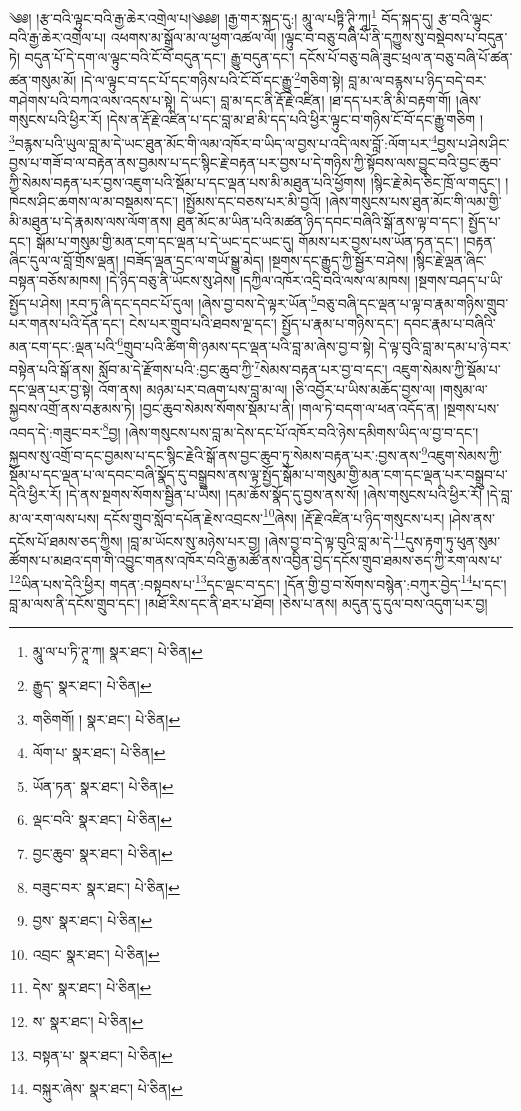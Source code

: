 \setcounter{footnote}{0} 
༄༅། །རྩ་བའི་ལྟུང་བའི་རྒྱ་ཆེར་འགྲེལ་པ།༄༅༅། །རྒྱ་གར་སྐད་དུ:། མཱུ་ལ་པཏྟི་ཊཱི་ཀཱ།\footnote{མཱུ་ལ་པ་ཏི་ཊཱ་ཀ།  སྣར་ཐང་།  པེ་ཅིན། } བོད་སྐད་དུ། རྩ་བའི་ལྟུང་བའི་རྒྱ་ཆེར་འགྲེལ་པ། འཕགས་མ་སྒྲོལ་མ་ལ་ཕྱག་འཚལ་ལོ། །ལྟུང་བ་བཅུ་བཞི་པོ་ནི་དཀྱུས་སུ་བསྡེབས་པ་བདུན་ཏེ། བདུན་པོ་དེ་དག་ལ་ལྟུང་བའི་ངོ་བོ་བདུན་དང་། རྒྱུ་བདུན་དང་། དངོས་པོ་བཅུ་བཞི་ཟུང་ཕྲལ་ན་བཅུ་བཞི་པོ་ཚན་ཚན་གསུམ་མོ། །དེ་ལ་ལྟུང་བ་དང་པོ་དང་གཉིས་པའི་ངོ་བོ་དང་རྒྱུ་\footnote{རྒྱུད་  སྣར་ཐང་།  པེ་ཅིན། }གཅིག་སྟེ། བླ་མ་ལ་བརྙས་པ་ཉིད་བདེ་བར་གཤེགས་པའི་བཀའ་ལས་འདས་པ་སྟེ། དེ་ཡང་། བླ་མ་དང་ནི་རྡོ་རྗེ་འཛིན། །ཐ་དད་པར་ནི་མི་བརྟག་གོ། །ཞེས་གསུངས་པའི་ཕྱིར་རོ། །དེས་ན་རྡོ་རྗེ་འཛིན་པ་དང་བླ་མ་ཐ་མི་དད་པའི་ཕྱིར་ལྟུང་བ་གཉིས་ངོ་བོ་དང་རྒྱུ་གཅིག །\footnote{གཅིགགོ། །  སྣར་ཐང་།  པེ་ཅིན། }བརྙས་པའི་ཡུལ་བླ་མ་དེ་ཡང་ཐུན་མོང་གི་ལམ་འཁོར་བ་ཡིད་ལ་བྱས་པ་འདི་ལས་བློ་:ལོག་པར་\footnote{ལོག་པ་  སྣར་ཐང་།  པེ་ཅིན། }བྱས་པ་ཤེས་ཤིང་བྱས་པ་གཟོ་བ་ལ་བརྟེན་ནས་བྱམས་པ་དང་སྙིང་རྗེ་བརྟན་པར་བྱས་པ་དེ་གཉིས་ཀྱི་སྟོབས་ལས་བྱུང་བའི་བྱང་ཆུབ་ཀྱི་སེམས་བརྟན་པར་བྱས་འཇུག་པའི་སྡོམ་པ་དང་ལྡན་པས་མི་མཐུན་པའི་ཕྱོགས། །སྙིང་རྗེ་མེད་ཅིང་ཁྲོ་ལ་གདུང་། །ཁེངས་ཤིང་ཆགས་ལ་མ་བསྡམས་དང་། །སྤྱོམས་དང་བཅས་པར་མི་བྱའོ། །ཞེས་གསུངས་པས་ཐུན་མོང་གི་ལམ་གྱི་མི་མཐུན་པ་དེ་རྣམས་ལས་ལོག་ནས། ཐུན་མོང་མ་ཡིན་པའི་མཚན་ཉིད་དབང་བཞིའི་སྒོ་ནས་ལྟ་བ་དང་། སྤྱོད་པ་དང་། སྒོམ་པ་གསུམ་གྱི་མན་ངག་དང་ལྡན་པ་དེ་ཡང་དང་ཡང་དུ། གོམས་པར་བྱས་པས་ཡོན་ཏན་དང་། །བརྟན་ཞིང་དུལ་ལ་བློ་གྲོས་ལྡན། །བཟོད་ལྡན་དྲང་ལ་གཡོ་སྒྱུ་མེད། །སྔགས་དང་རྒྱུད་ཀྱི་སྦྱོར་བ་ཤེས། །སྙིང་རྗེ་ལྡན་ཞིང་བསྟན་བཅོས་མཁས། །དེ་ཉིད་བཅུ་ནི་ཡོངས་སུ་ཤེས། །དཀྱིལ་འཁོར་འདྲི་བའི་ལས་ལ་མཁས། །སྔགས་བཤད་པ་ཡི་སྤྱོད་པ་ཤེས། །རབ་ཏུ་ཞི་དང་དབང་པོ་དུལ། །ཞེས་བྱ་བས་དེ་ལྟར་ཡོན་\footnote{ཡོན་ཏན་  སྣར་ཐང་།  པེ་ཅིན། }བཅུ་བཞི་དང་ལྡན་པ་ལྟ་བ་རྣམ་གཉིས་གྲུབ་པར་གནས་པའི་དོན་དང་། ངེས་པར་གྲུབ་པའི་ཐབས་ལྔ་དང་། སྤྱོད་པ་རྣམ་པ་གཉིས་དང་། དབང་རྣམ་པ་བཞིའི་མན་ངག་དང་:ལྡན་པའི་\footnote{ལྡང་བའི་  སྣར་ཐང་།  པེ་ཅིན། }གྲུབ་པའི་ཚིག་གི་ཉམས་དང་ལྡན་པའི་བླ་མ་ཞེས་བྱ་བ་སྟེ། དེ་ལྟ་བུའི་བླ་མ་དམ་པ་ཉེ་བར་བསྟེན་པའི་སྒོ་ནས། སློབ་མ་དེ་རྫོགས་པའི་:བྱང་ཆུབ་ཀྱི་\footnote{བྱང་ཆུབ་  སྣར་ཐང་།  པེ་ཅིན། }སེམས་བརྟན་པར་བྱ་བ་དང་། འཇུག་སེམས་ཀྱི་སྡོམ་པ་དང་ལྡན་པར་བྱ་སྟེ། འོག་ནས། མཉམ་པར་བཞག་པས་བླ་མ་ལ། །ཅི་འབྱོར་པ་ཡིས་མཆོད་བྱས་ལ། །གསུམ་ལ་སྐྱབས་འགྲོ་ནས་བརྩམས་ཏེ། །བྱང་ཆུབ་སེམས་སོགས་སྡོམ་པ་ནི། །གལ་ཏེ་བདག་ལ་ཕན་འདོད་ན། །སྔགས་པས་འབད་དེ་:གཟུང་བར་\footnote{བཟུང་བར་  སྣར་ཐང་།  པེ་ཅིན། }བྱ། །ཞེས་གསུངས་པས་བླ་མ་དེས་དང་པོ་འཁོར་བའི་ཉེས་དམིགས་ཡིད་ལ་བྱ་བ་དང་། སྐྱབས་སུ་འགྲོ་བ་དང་བྱམས་པ་དང་སྙིང་རྗེའི་སྒོ་ནས་བྱང་ཆུབ་ཏུ་སེམས་བརྟན་པར་:བྱས་ནས་\footnote{བྱས་  སྣར་ཐང་།  པེ་ཅིན། }འཇུག་སེམས་ཀྱི་སྡོམ་པ་དང་ལྡན་པ་ལ་དབང་བཞི་སྣོད་དུ་བསྒྲུབས་ནས་ལྟ་སྤྱོད་སྒོམ་པ་གསུམ་གྱི་མན་ངག་དང་ལྡན་པར་བསྒྲུབ་པ་དེའི་ཕྱིར་རོ། །དེ་ནས་སྔགས་སོགས་སྦྱིན་པ་ཡིས། །དམ་ཆོས་སྣོད་དུ་བྱས་ནས་སོ། །ཞེས་གསུངས་པའི་ཕྱིར་རོ། །དེ་བླ་མ་ལ་རག་ལས་པས། དངོས་གྲུབ་སློབ་དཔོན་རྗེས་འབྲངས་\footnote{འབྲང་  སྣར་ཐང་།  པེ་ཅིན། }ཞེས། །རྡོ་རྗེ་འཛིན་པ་ཉིད་གསུངས་པར། །ཤེས་ནས་དངོས་པོ་ཐམས་ཅད་ཀྱིས། །བླ་མ་ཡོངས་སུ་མཉེས་པར་བྱ། །ཞེས་བྱ་བ་དེ་ལྟ་བུའི་བླ་མ་དེ་\footnote{དེས་  སྣར་ཐང་།  པེ་ཅིན། }དུས་རྟག་ཏུ་ཕུན་སུམ་ཚོགས་པ་མཐའ་དག་གི་འབྱུང་གནས་འཁོར་བའི་རྒྱ་མཚོ་ནས་འབྱིན་བྱེད་དངོས་གྲུབ་ཐམས་ཅད་ཀྱི་རག་ལས་པ་\footnote{ས་  སྣར་ཐང་།  པེ་ཅིན། }ཡིན་པས་དེའི་ཕྱིར། གདན་:བསྟབས་པ་\footnote{བསྟན་པ་  སྣར་ཐང་།  པེ་ཅིན། }དང་ལྡང་བ་དང་། །དོན་གྱི་བྱ་བ་སོགས་བསྙེན་:བཀུར་བྱེད་\footnote{བསྐུར་ཞེས་  སྣར་ཐང་།  པེ་ཅིན། }པ་དང་། བླ་མ་ལས་ནི་དངོས་གྲུབ་དང་། །མཐོ་རིས་དང་ནི་ཐར་པ་ཐོབ། །ཅེས་པ་ནས། མདུན་དུ་དུལ་བས་འདུག་པར་བྱ། 